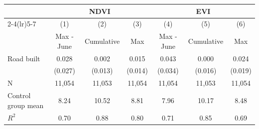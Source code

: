 {
\def\sym#1{\ifmmode^{#1}\else\(^{#1}\)\fi}
\begin{tabular}{l*{6}{c}}
\hline\hline
                         &\multicolumn{3}{c}{NDVI}                       &\multicolumn{3}{c}{EVI}                        \\\cmidrule(lr){2-4}\cmidrule(lr){5-7}
                         &\multicolumn{1}{c}{(1)}&\multicolumn{1}{c}{(2)}&\multicolumn{1}{c}{(3)}&\multicolumn{1}{c}{(4)}&\multicolumn{1}{c}{(5)}&\multicolumn{1}{c}{(6)}\\
                         &\multicolumn{1}{c}{Max - June}&\multicolumn{1}{c}{Cumulative}&\multicolumn{1}{c}{Max}&\multicolumn{1}{c}{Max - June}&\multicolumn{1}{c}{Cumulative}&\multicolumn{1}{c}{Max}\\
\hline
Road built               &       0.028   &       0.002   &       0.015   &       0.043   &       0.000   &       0.024   \\
                         &     (0.027)   &     (0.013)   &     (0.014)   &     (0.034)   &     (0.016)   &     (0.019)   \\
\hline
N                        &      11,054   &      11,053   &      11,054   &      11,054   &      11,053   &      11,054   \\
Control group mean       &        8.24   &       10.52   &        8.81   &        7.96   &       10.17   &        8.48   \\
$ R^{2} $                &        0.70   &        0.88   &        0.80   &        0.71   &        0.85   &        0.69   \\
\hline\hline
\end{tabular}
}
